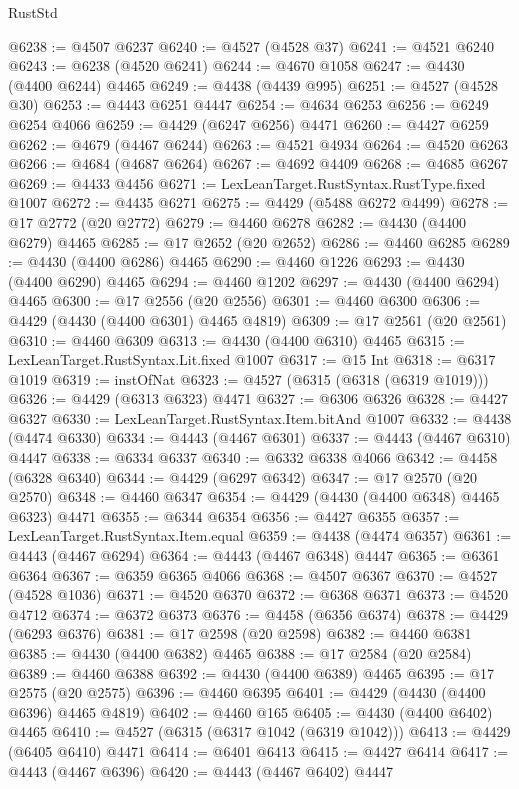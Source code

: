 \begin{lexlean}{RustStd}
\begin{coremodule}
{\begin{coremodule}
{{{{{{{{{{{{{{{{{{{{{{{{{{{{{{{{{{{{{{{{{{{{{{{{{{{{{{{{{{{{{{{{{{{{@6238 := @4507 @6237
@6240 := @4527 (@4528 @37)
@6241 := @4521 @6240
@6243 := @6238 (@4520 @6241)
@6244 := @4670 @1058
@6247 := @4430 (@4400 @6244) @4465
@6249 := @4438 (@4439 @995)
@6251 := @4527 (@4528 @30)
@6253 := @4443 @6251 @4447
@6254 := @4634 @6253
@6256 := @6249 @6254 @4066
@6259 := @4429 (@6247 @6256) @4471
@6260 := @4427 @6259
@6262 := @4679 (@4467 @6244)
@6263 := @4521 @4934
@6264 := @4520 @6263
@6266 := @4684 (@4687 @6264)
@6267 := @4692 @4409
@6268 := @4685 @6267
@6269 := @4433 @4456
@6271 := LexLeanTarget.RustSyntax.RustType.fixed @1007
@6272 := @4435 @6271
@6275 := @4429 (@5488 @6272 @4499)
@6278 := @17 @2772 (@20 @2772)
@6279 := @4460 @6278
@6282 := @4430 (@4400 @6279) @4465
@6285 := @17 @2652 (@20 @2652)
@6286 := @4460 @6285
@6289 := @4430 (@4400 @6286) @4465
@6290 := @4460 @1226
@6293 := @4430 (@4400 @6290) @4465
@6294 := @4460 @1202
@6297 := @4430 (@4400 @6294) @4465
@6300 := @17 @2556 (@20 @2556)
@6301 := @4460 @6300
@6306 := @4429 (@4430 (@4400 @6301) @4465 @4819)
@6309 := @17 @2561 (@20 @2561)
@6310 := @4460 @6309
@6313 := @4430 (@4400 @6310) @4465
@6315 := LexLeanTarget.RustSyntax.Lit.fixed @1007
@6317 := @15 Int
@6318 := @6317 @1019
@6319 := instOfNat
@6323 := @4527 (@6315 (@6318 (@6319 @1019)))
@6326 := @4429 (@6313 @6323) @4471
@6327 := @6306 @6326
@6328 := @4427 @6327
@6330 := LexLeanTarget.RustSyntax.Item.bitAnd @1007
@6332 := @4438 (@4474 @6330)
@6334 := @4443 (@4467 @6301)
@6337 := @4443 (@4467 @6310) @4447
@6338 := @6334 @6337
@6340 := @6332 @6338 @4066
@6342 := @4458 (@6328 @6340)
@6344 := @4429 (@6297 @6342)
@6347 := @17 @2570 (@20 @2570)
@6348 := @4460 @6347
@6354 := @4429 (@4430 (@4400 @6348) @4465 @6323) @4471
@6355 := @6344 @6354
@6356 := @4427 @6355
@6357 := LexLeanTarget.RustSyntax.Item.equal
@6359 := @4438 (@4474 @6357)
@6361 := @4443 (@4467 @6294)
@6364 := @4443 (@4467 @6348) @4447
@6365 := @6361 @6364
@6367 := @6359 @6365 @4066
@6368 := @4507 @6367
@6370 := @4527 (@4528 @1036)
@6371 := @4520 @6370
@6372 := @6368 @6371
@6373 := @4520 @4712
@6374 := @6372 @6373
@6376 := @4458 (@6356 @6374)
@6378 := @4429 (@6293 @6376)
@6381 := @17 @2598 (@20 @2598)
@6382 := @4460 @6381
@6385 := @4430 (@4400 @6382) @4465
@6388 := @17 @2584 (@20 @2584)
@6389 := @4460 @6388
@6392 := @4430 (@4400 @6389) @4465
@6395 := @17 @2575 (@20 @2575)
@6396 := @4460 @6395
@6401 := @4429 (@4430 (@4400 @6396) @4465 @4819)
@6402 := @4460 @165
@6405 := @4430 (@4400 @6402) @4465
@6410 := @4527 (@6315 (@6317 @1042 (@6319 @1042)))
@6413 := @4429 (@6405 @6410) @4471
@6414 := @6401 @6413
@6415 := @4427 @6414
@6417 := @4443 (@4467 @6396)
@6420 := @4443 (@4467 @6402) @4447
}}}}}}}}}}}}}}}}}}}}}}}}}}}}}}}}}}}}}}}}}}}}}}}}}}}}}}}}}}}}}}}}}}}}
\end{coremodule}}
\end{coremodule}
\end{lexlean}
